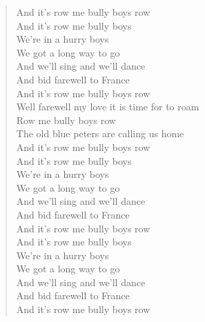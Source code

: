\documentclass[11pt]{article}
\begin{document}
\begin{verse}
And it's row me bully boys row\\
\vspace*{1em}
And it's row me bully boys\\
We're in a hurry boys\\
We got a long way to go\\
And we'll sing and we'll dance\\
And bid farewell to France\\
And it's row me bully boys row\\
\vspace*{1em}
Well farewell my love it is time for to roam\\
Row me bully boys row\\
The old blue peters are calling us home\\
And it's row me bully boys row\\
\vspace*{1em}
And it's row me bully boys\\
We're in a hurry boys\\
We got a long way to go\\
And we'll sing and we'll dance\\
And bid farewell to France\\
And it's row me bully boys row\\
\vspace*{1em}
And it's row me bully boys\\
We're in a hurry boys\\
We got a long way to go\\
And we'll sing and we'll dance\\
And bid farewell to France\\
And it's row me bully boys row\\
\end{verse}
\clearpage
\end{document}

